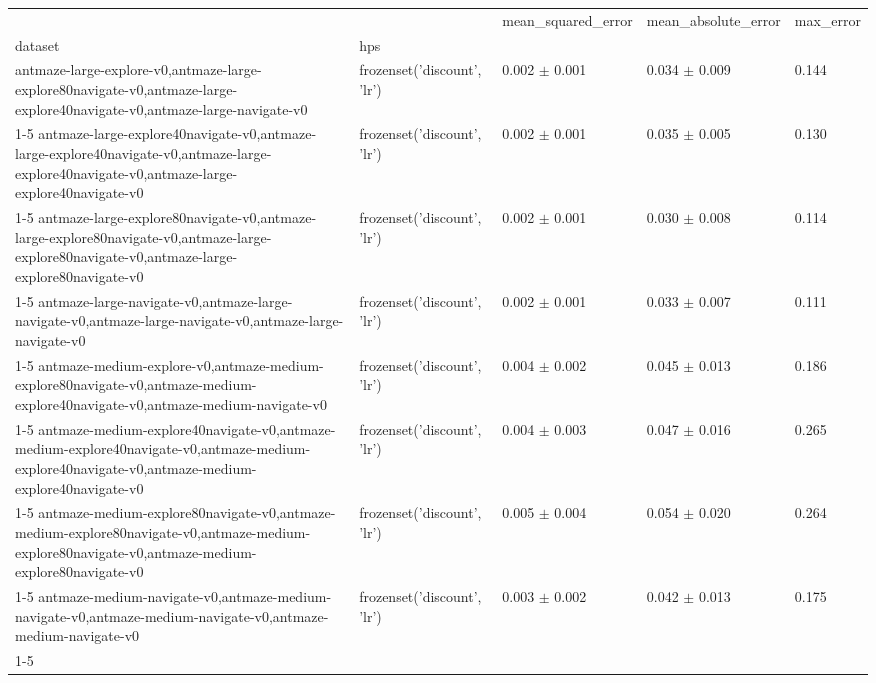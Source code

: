 \begin{tabular}{lllll}
\toprule
 &  & mean_squared_error & mean_absolute_error & max_error \\
dataset & hps &  &  &  \\
\midrule
antmaze-large-explore-v0,antmaze-large-explore80navigate-v0,antmaze-large-explore40navigate-v0,antmaze-large-navigate-v0 & frozenset({'discount', 'lr'}) & 0.002 $\pm$ 0.001 & 0.034 $\pm$ 0.009 & 0.144 \\
\cline{1-5}
antmaze-large-explore40navigate-v0,antmaze-large-explore40navigate-v0,antmaze-large-explore40navigate-v0,antmaze-large-explore40navigate-v0 & frozenset({'discount', 'lr'}) & 0.002 $\pm$ 0.001 & 0.035 $\pm$ 0.005 & 0.130 \\
\cline{1-5}
antmaze-large-explore80navigate-v0,antmaze-large-explore80navigate-v0,antmaze-large-explore80navigate-v0,antmaze-large-explore80navigate-v0 & frozenset({'discount', 'lr'}) & 0.002 $\pm$ 0.001 & 0.030 $\pm$ 0.008 & 0.114 \\
\cline{1-5}
antmaze-large-navigate-v0,antmaze-large-navigate-v0,antmaze-large-navigate-v0,antmaze-large-navigate-v0 & frozenset({'discount', 'lr'}) & 0.002 $\pm$ 0.001 & 0.033 $\pm$ 0.007 & 0.111 \\
\cline{1-5}
antmaze-medium-explore-v0,antmaze-medium-explore80navigate-v0,antmaze-medium-explore40navigate-v0,antmaze-medium-navigate-v0 & frozenset({'discount', 'lr'}) & 0.004 $\pm$ 0.002 & 0.045 $\pm$ 0.013 & 0.186 \\
\cline{1-5}
antmaze-medium-explore40navigate-v0,antmaze-medium-explore40navigate-v0,antmaze-medium-explore40navigate-v0,antmaze-medium-explore40navigate-v0 & frozenset({'discount', 'lr'}) & 0.004 $\pm$ 0.003 & 0.047 $\pm$ 0.016 & 0.265 \\
\cline{1-5}
antmaze-medium-explore80navigate-v0,antmaze-medium-explore80navigate-v0,antmaze-medium-explore80navigate-v0,antmaze-medium-explore80navigate-v0 & frozenset({'discount', 'lr'}) & 0.005 $\pm$ 0.004 & 0.054 $\pm$ 0.020 & 0.264 \\
\cline{1-5}
antmaze-medium-navigate-v0,antmaze-medium-navigate-v0,antmaze-medium-navigate-v0,antmaze-medium-navigate-v0 & frozenset({'discount', 'lr'}) & 0.003 $\pm$ 0.002 & 0.042 $\pm$ 0.013 & 0.175 \\
\cline{1-5}
\bottomrule
\end{tabular}
